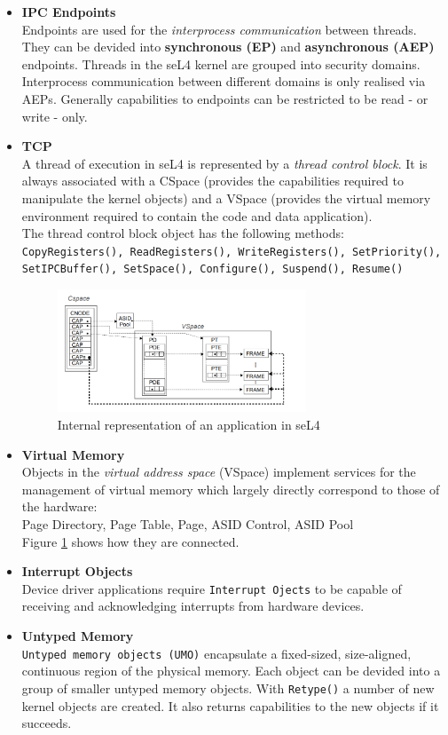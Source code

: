 \begin{itemize}
\item \textbf{IPC Endpoints} \\
Endpoints are used for the \textit{interprocess communication} between threads. They can be devided into \textbf{synchronous (EP)} and \textbf{asynchronous (AEP)} endpoints. 
Threads in the seL4 kernel are grouped into security domains. Interprocess communication between different domains is only realised via AEPs. Generally capabilities to endpoints can be restricted to be read - or write - only. 
\item \textbf{TCP} \\
A thread of execution in seL4 is represented by a \textit{thread control block}. It is always associated with a CSpace (provides the capabilities required to manipulate the kernel objects) and a VSpace (provides the virtual memory environment required to contain the code and data application). \\
The thread control block object has the following methods: \\
\texttt{CopyRegisters(), ReadRegisters(), WriteRegisters(), SetPriority(), \\ SetIPCBuffer(), SetSpace(), Configure(), Suspend(), Resume()}
	\begin{figure}[ht]
	\centering
		\includegraphics[width=0.7\textwidth]{./Pictures/applicationIntern.png}
	\caption[Internal representation of an application]{Internal representation of an application in seL4 \cite{sel4}}
	\label{fig:intapp}
	\end{figure}
	
\item \textbf{Virtual Memory}\\
Objects in the \textit{virtual address space} (VSpace) implement services for the management of virtual memory which largely directly correspond to those of the hardware: \\
Page Directory, Page Table, Page, ASID Control, ASID Pool \\
Figure \ref{fig:intapp} shows how they are connected.
\item \textbf{Interrupt Objects} \\
Device driver applications require \texttt{Interrupt Ojects} to be capable of receiving and acknowledging interrupts from hardware devices.
\item \textbf{Untyped Memory} \\
\texttt{Untyped memory objects (UMO)} encapsulate a fixed-sized, size-aligned, continuous region of the physical memory. Each object can be devided into a group of smaller untyped memory objects. With \texttt{Retype()} a number of new kernel objects are created. It also returns capabilities to the new objects if it succeeds. 
\end{itemize}

